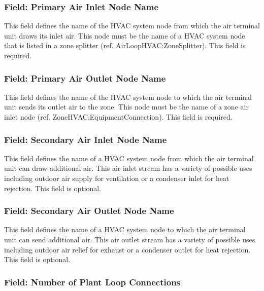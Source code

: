 \subsubsection{Field: Primary Air Inlet Node Name}\label{field-primary-air-inlet-node-name-1-000}

This field defines the name of the HVAC system node from which the air terminal unit draws its inlet air. This node must be the name of a HVAC system node that is listed in a zone splitter (ref. AirLoopHVAC:ZoneSplitter). This field is required.

\subsubsection{Field: Primary Air Outlet Node Name}\label{field-primary-air-outlet-node-name-1-000}

This field defines the name of the HVAC system node to which the air terminal unit sends its outlet air to the zone. This node must be the name of a zone air inlet node (ref. ZoneHVAC:EquipmentConnection). This field is required.

\subsubsection{Field: Secondary Air Inlet Node Name}\label{field-secondary-air-inlet-node-name-1-001}

This field defines the name of a HVAC system node from which the air terminal unit can draw additional air. This air inlet stream has a variety of possible uses including outdoor air supply for ventilation or a condenser inlet for heat rejection. This field is optional.

\subsubsection{Field: Secondary Air Outlet Node Name}\label{field-secondary-air-outlet-node-name-1}

This field defines the name of a HVAC system node to which the air terminal unit can send additional air. This air outlet stream has a variety of possible uses including outdoor air relief for exhaust or a condenser outlet for heat rejection. This field is optional.

\subsubsection{Field: Number of Plant Loop Connections}\label{field-number-of-plant-loop-connections-1}

